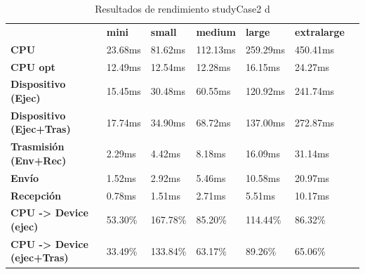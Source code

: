 \begin{table}[H]
    \centering
    \begin{tabular}{lllllll}
    \rowcolor[HTML]{DAE8FC} \ &  \textbf{mini} &  \textbf{small} &  \textbf{medium} &  \textbf{	large} &  \textbf{	extralarge} \\
    \cellcolor[HTML]{DAE8FC} \textbf{CPU} & 23.68ms & 81.62ms & 112.13ms & 	259.29ms & 	450.41ms \\
    \rowcolor[HTML]{EFEFEF} \cellcolor[HTML]{DAE8FC} \textbf{CPU opt} & 12.49ms & 12.54ms & 12.28ms & 	16.15ms & 	24.27ms \\
    \cellcolor[HTML]{DAE8FC} \textbf{Dispositivo (Ejec)} & 15.45ms & 30.48ms & 60.55ms & 	120.92ms & 	241.74ms \\
    \rowcolor[HTML]{EFEFEF} \cellcolor[HTML]{DAE8FC} \textbf{Dispositivo (Ejec+Tras)} & 17.74ms & 34.90ms & 68.72ms & 	137.00ms & 	272.87ms \\
    \cellcolor[HTML]{DAE8FC} \textbf{Trasmisión (Env+Rec)} & 2.29ms & 4.42ms & 8.18ms & 	16.09ms & 	31.14ms \\
    \rowcolor[HTML]{EFEFEF} \cellcolor[HTML]{DAE8FC} \textbf{Envío} & 1.52ms & 2.92ms & 5.46ms & 	10.58ms & 	20.97ms \\
    \cellcolor[HTML]{DAE8FC} \textbf{Recepción} & 0.78ms & 1.51ms & 2.71ms & 	5.51ms & 	10.17ms \\
    \rowcolor[HTML]{EFEFEF} \cellcolor[HTML]{DAE8FC} \textbf{CPU -> Device (ejec)} & 53.30\% & 167.78\% & 85.20\% & 	114.44\% & 	86.32\% \\
    \cellcolor[HTML]{DAE8FC} \textbf{CPU -> Device (ejec+Tras)} & 33.49\% & 133.84\% & 63.17\% & 	89.26\% & 	65.06\% \\
    \end{tabular}
    \caption[Resultados de rendimiento studyCase2 d]{{Resultados de rendimiento studyCase2 d}}
    \label{table_test_studyCase2_d_hw_performanceResults}
\end{table}